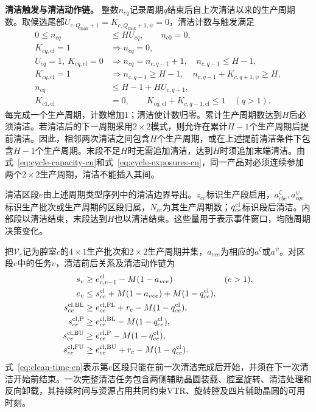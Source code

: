 \documentclass[final,5p,times,twocolumn]{elsarticle}
\begin{document}
\noindent\textbf{清洁触发与清洁动作链。}
整数$n_{cq}$记录周期$q$结束后自上次清洁以来的生产周期数。取候选尾部$U_{c,Q_{\max}+1}=K_{c,Q_{\max}+1,\psi}=0$，清洁计数与触发满足
\begin{equation}
\begin{aligned}
0\le n_{cq}&\le H U_{cq},\qquad n_{c0}=0,\\
K_{cq,\mathrm{cl}}=1&\Rightarrow n_{cq}=0,\\
U_{cq}=1,\ K_{cq,\mathrm{cl}}=0
&\Rightarrow n_{cq}=n_{c,q-1}+1,\quad n_{c,q-1}\le H-1,\\
K_{cq,\mathrm{cl}}=1&\Rightarrow n_{c,q-1}\ge H-1,\quad
n_{c,q-1}+K_{c,q+1,\psi}\ge H,\\
n_{cq}&\le H-1+H U_{c,q+1},\\
K_{c1,\mathrm{cl}}&=0,\qquad
K_{cq,\mathrm{cl}}+K_{c,q-1,\mathrm{cl}}\le1\quad(q>1).
\end{aligned}
\label{eq:clean-counter-cn}
\end{equation}
每完成一个生产周期，计数增加1；清洁使计数归零。累计生产周期数达到$H$后必须清洁。若清洁后的下一周期采用$2\times2$模式，则允许在累计$H-1$个生产周期后提前清洁。因此，相邻两次清洁之间包含$H$个生产周期，或在上述提前清洁条件下包含$H-1$个生产周期。末段不足$H$时无需追加清洁，达到$H$时须追加末端清洁。由式~\eqref{eq:cycle-capacity-cn}和式~\eqref{eq:cycle-exposures-cn}，同一产品对必须连续参加两个$2\times2$生产周期，清洁不能插入其间。

清洁区段$e$由上述周期类型序列中的清洁边界导出。$z_{ce}$标识生产段启用，$a^{\zeta}_{cbe},a^{\psi}_{cqe}$标识生产批次或生产周期的区段归属，$N_{ce}$为其生产周期数；$q^{\rm cl}_{ce}$标识段后清洁。内部段以清洁结束，末段达到$H$也以清洁结束。这些量用于表示事件窗口，均随周期决策变化。



把$\mathcal V_c$记为腔室$c$的$4\times1$生产批次和$2\times2$生产周期并集，$a_{vce}$为相应的$a^{\zeta}$或$a^{\psi}$。对区段$e$中的任务$v$，清洁前后关系及清洁动作链为
\begin{equation}
\begin{aligned}
s_v&\ge e^{\rm cl}_{c,e-1}-M(1-a_{vce}) &&(e>1),\\
e_v&\le s^{\rm cl}_{ce}+M(1-a_{vce})+M(1-q^{\rm cl}_{ce}),\\
s^{\rm cl,BL}_{ce}&\ge e^{\rm cl,FL}_{ce}+r_c-M(1-q^{\rm cl}_{ce}),\\
s^{\rm cl,P}_{ce}&\ge e^{\rm cl,BL}_{ce}-M(1-q^{\rm cl}_{ce}),\\
s^{\rm cl,BU}_{ce}&\ge e^{\rm cl,P}_{ce}-M(1-q^{\rm cl}_{ce}),\\
s^{\rm cl,FU}_{ce}&\ge e^{\rm cl,BU}_{ce}+r_c-M(1-q^{\rm cl}_{ce}).
\end{aligned}
\label{eq:clean-time-cn}
\end{equation}
式~\eqref{eq:clean-time-cn}表示第$e$区段只能在前一次清洁完成后开始，并须在下一次清洁开始前结束。一次完整清洁任务包含两侧辅助晶圆装载、腔室旋转、清洁处理和反向卸载，其持续时间与资源占用共同约束VTR、旋转腔及四片辅助晶圆的可用时刻。
\end{document}
